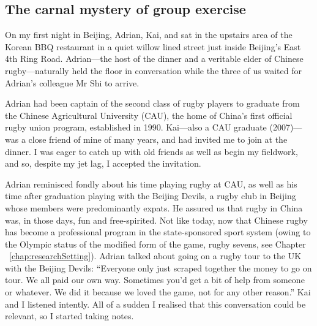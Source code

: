                                           \begin{CJK}{UTF8}{gbsn}

\section{The carnal mystery of group exercise \label{sec:adrian}}


On my first night in Beijing, Adrian, Kai, and sat in the upstairs area of the Korean BBQ restaurant in a quiet willow lined street just inside Beijing's East 4th Ring Road.  Adrian---the host of the dinner and a veritable elder of Chinese rugby---naturally held the floor in conversation while the three of us waited for Adrian's colleague Mr Shi to arrive.

Adrian had been captain of the second class of rugby players to graduate from the Chinese Agricultural University (CAU), the home of China's first official rugby union program, established in 1990. Kai---also a CAU graduate (2007)---was a close friend of mine of many years, and had invited me to join at the dinner.  I was eager to catch up with old friends as well as begin my fieldwork, and so, despite my jet lag, I accepted the invitation.

Adrian reminisced fondly about his time playing rugby at CAU, as well as his time after graduation playing with the Beijing Devils, a rugby club in Beijing whose members were predominantly expats.  He assured us that rugby in China was, in those days, fun and free-spirited.  Not like today, now that Chinese rugby has become a professional program in the state-sponsored sport system (owing to the Olympic status of the modified form of the game, rugby sevens, see Chapter ~\ref{chap:researchSetting}).  Adrian talked about going on a rugby tour to the UK with the Beijing Devils:  ``Everyone only just scraped together the money to go on tour.  We all paid our own way. Sometimes you'd get a bit of help from someone or whatever. We did it because we loved the game, not for any other reason.''   Kai and I listened intently.  All of a sudden I realised that this conversation could be relevant, so I started taking notes.


\end{CJK}
